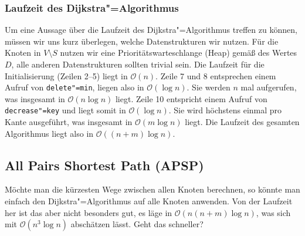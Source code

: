 \subsubsection{Laufzeit des Dijkstra"=Algorithmus}
Um eine Aussage über die Laufzeit des Dijkstra"=Algorithmus treffen zu können, müssen wir uns kurz überlegen, welche Datenstrukturen wir nutzen. Für die Knoten in $V \setminus S$ nutzen wir eine Prioritätswarteschlange (Heap) gemäß des Wertes $D$, alle anderen Datenstrukturen sollten trivial sein. Die Laufzeit für die Initialisierung (Zeilen 2--5) liegt in $\mathcal{O}(n)$. Zeile 7 und 8 entsprechen einem Aufruf von \texttt{delete"=min}, liegen also in $\mathcal{O}(\log n)$. Sie werden $n$ mal aufgerufen, was insgesamt in $\mathcal{O}(n \log n)$ liegt. Zeile 10 entspricht einem Aufruf von \texttt{decrease"=key} und liegt somit in $\mathcal{O}(\log n)$. Sie wird höchstens einmal pro Kante ausgeführt, was insgesamt in $\mathcal{O}(m \log n)$ liegt. Die Laufzeit des gesamten Algorithmus liegt also in $\mathcal{O}((n+m)\log n)$.

\subsection{All Pairs Shortest Path (APSP)}
Möchte man die kürzesten Wege zwischen allen Knoten berechnen, so könnte man einfach den Dijkstra"=Algorithmus auf alle Knoten anwenden. Von der Laufzeit her ist das aber nicht besonders gut, es läge in $\mathcal{O}(n (n+m) \log n)$, was sich mit $\mathcal{O}(n^3 \log n)$ abschätzen lässt. Geht das schneller?

%
%
%
%
%
%


